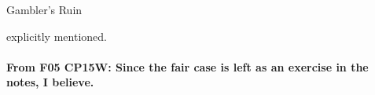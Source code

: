\documentclass[handout]{mcs}
\begin{document}


\begin{staffnotes}
Gambler's Ruin
\end{staffnotes}

explicitly mentioned.
\\\\
\textbf{From F05 CP15W: Since the fair case is left as an exercise in the notes, I believe.}

\end{document}
